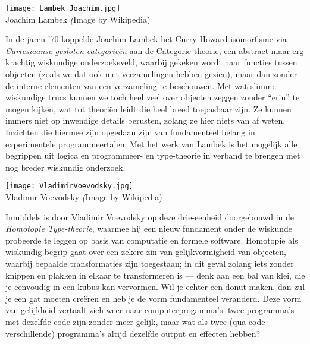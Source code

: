 \begin{aside}
  \begin{marginfigure}
\texttt{[image: Lambek\_Joachim.jpg]}\\
    Joachim Lambek {\scriptsize\emph (Image by Wikipedia)}\\[3mm]
  \end{marginfigure}

  In de jaren '70 koppelde Joachim Lambek het Curry-Howard isomorfisme via \emph{Cartesiaanse gesloten categorie\"en} aan de Categorie-theorie, een abstract maar erg krachtig wiskundige onderzoeksveld, waarbij gekeken wordt naar functies tussen objecten (zoals we dat ook met verzamelingen hebben gezien), maar dan zonder de interne elementen van een verzameling te beschouwen. Met wat slimme wiskundige trucs kunnen we toch heel veel over objecten zeggen zonder \enquote{erin} te mogen kijken, wat tot theori\"en leidt die heel breed toepasbaar zijn. Ze kunnen immers niet op inwendige details berusten, zolang ze hier niets van af weten. Inzichten die hiermee zijn opgedaan zijn van fundamenteel belang in experimentele programmeertalen. Met het werk van Lambek is het mogelijk alle begrippen uit logica en programmeer- en type-theorie in verband te brengen met nog breder wiskundig onderzoek.

  \begin{marginfigure}
\texttt{[image: VladimirVoevodsky.jpg]}\\
    Vladimir Voevodsky {\scriptsize\emph (Image by Wikipedia)}\\[3mm]
  \end{marginfigure}

Inmiddels is door Vladimir Voevodsky op deze drie-eenheid doorgebouwd in de \emph{Homotopie Type-theorie}, waarmee hij een nieuw fundament onder de wiskunde probeerde te leggen op basis van computatie en formele software. Homotopie als wiskundig begrip gaat over een zekere zin van gelijkvormigheid van objecten, waarbij bepaalde transformaties zijn toegestaan; in dit geval zolang iets zonder knippen en plakken in elkaar te transformeren is --- denk aan een bal van klei, die je eenvoudig in een kubus kan vervormen. Wil je echter een donut maken, dan zul je een gat moeten cre\"eren en heb je de vorm fundamenteel veranderd. Deze vorm van gelijkheid vertaalt zich weer naar computerprogamma's: twee programma's met dezelfde code zijn zonder meer gelijk, maar wat als twee (qua code verschillende) programma's altijd dezelfde output en effecten hebben?
\end{aside}
